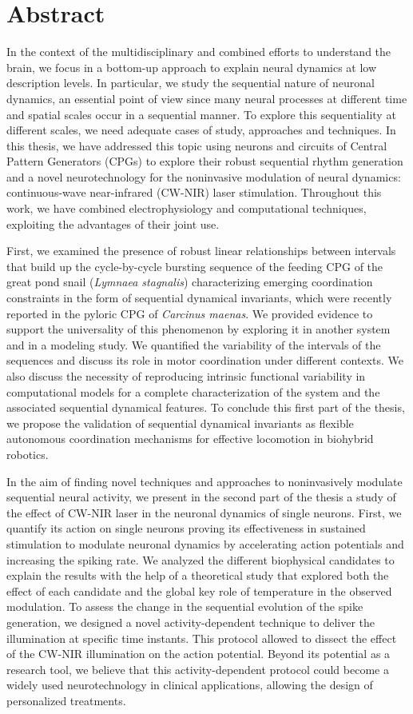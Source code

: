 \chapter*{Abstract}
In the context of the multidisciplinary and combined efforts to understand the brain, we focus in a bottom-up approach to explain neural dynamics at low description levels. In particular, we study the sequential nature of neuronal dynamics, an essential point of view since many neural processes at different time and spatial scales occur in a sequential manner. To explore this sequentiality at different scales, we need adequate cases of study, approaches and techniques. In this thesis, we have addressed this topic using neurons and circuits of Central Pattern Generators (CPGs) to explore their robust sequential rhythm generation and a novel neurotechnology for the noninvasive modulation of neural dynamics: continuous-wave near-infrared (CW-NIR) laser stimulation. Throughout this work, we have combined electrophysiology and computational techniques, exploiting the advantages of their joint use. 

First, we examined the presence of robust linear relationships between intervals that build up the cycle-by-cycle bursting sequence of the feeding CPG of the great pond snail (\textit{Lymnaea stagnalis}) characterizing emerging coordination constraints in the form of sequential dynamical invariants, which were recently reported in the pyloric CPG of \textit{Carcinus maenas}. We provided evidence to support the universality of this phenomenon by exploring it in another system and in a modeling study. We quantified the variability of the intervals of the sequences and discuss its role in motor coordination under different contexts. We also discuss the necessity of reproducing intrinsic functional variability in computational models for a complete characterization of the system and the associated sequential dynamical features. To conclude this first part of the thesis, we propose the validation of sequential dynamical invariants as flexible autonomous coordination mechanisms for  effective locomotion in biohybrid robotics. 

In the aim of finding novel techniques and approaches to noninvasively modulate sequential neural activity, we present in the second part of the thesis a study of the effect of CW-NIR laser in the neuronal dynamics of single neurons. First, we quantify its action on single neurons proving its effectiveness in sustained stimulation to modulate neuronal dynamics by accelerating action potentials and increasing the spiking rate. We analyzed the different biophysical candidates to explain the results with the help of a theoretical study that explored both the effect of each candidate and the global key role of temperature in the observed modulation. To assess the change in the sequential evolution of the spike generation, we designed a novel activity-dependent technique to deliver the illumination at specific time instants. This protocol allowed to dissect the effect of the CW-NIR illumination on the action potential. Beyond its potential as a research tool, we believe that this activity-dependent protocol could become a widely used neurotechnology in clinical applications, allowing the design of personalized treatments. 

